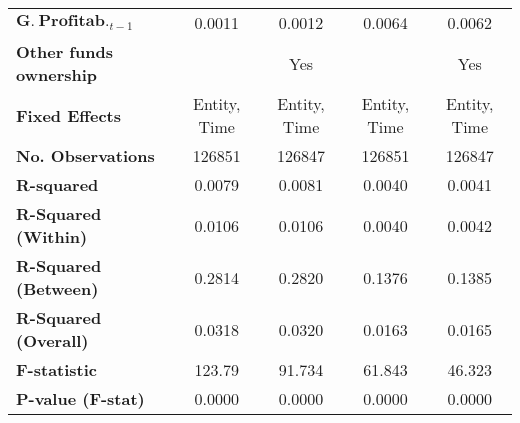 {\begin{longtable}{>{\bfseries}lcccc}
$\mathbf{G.~Profitab.}_{t-1}$    &       0.0011       &              0.0012             &       0.0064       &           0.0062            \\
Other funds ownership                      &                    &              Yes                &                    &           Yes               \\
\midrule
Fixed Effects                           &       Entity, Time       &              Entity, Time             &       Entity, Time       &           Entity, Time            \\
\bottomrule
\toprule
\textbf{No. Observations}                  &       126851       &              126847             &       126851       &           126847            \\
\textbf{R-squared}                         &       0.0079       &              0.0081             &       0.0040       &           0.0041            \\
\textbf{R-Squared (Within)}                &       0.0106       &              0.0106             &       0.0040       &           0.0042            \\
\textbf{R-Squared (Between)}               &       0.2814       &              0.2820             &       0.1376       &           0.1385            \\
\textbf{R-Squared (Overall)}               &       0.0318       &              0.0320             &       0.0163       &           0.0165            \\
\textbf{F-statistic}                       &       123.79       &              91.734             &       61.843       &           46.323            \\
\textbf{P-value (F-stat)}                  &       0.0000       &              0.0000             &       0.0000       &           0.0000            \\
\bottomrule
\end{longtable}
}
